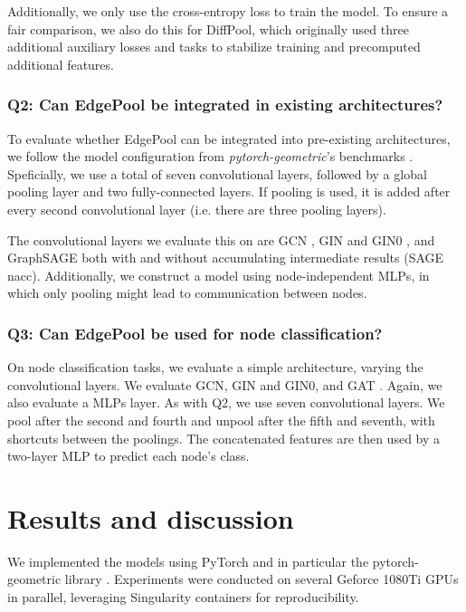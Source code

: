 \documentclass{article}
\newcommand{\edgepool}{EdgePool}
\begin{document}
Additionally, we only use the cross-entropy loss to train the model. To ensure a fair comparison, we also do this for DiffPool, which originally used three additional auxiliary losses and tasks to stabilize training and precomputed additional features.


\subsubsection{Q2: Can \edgepool{} be integrated in existing architectures?}
To evaluate whether \edgepool{} can be integrated into pre-existing architectures, we follow the model configuration from \textit{pytorch-geometric}'s benchmarks \citep{feyFastGraphRepresentation2019}. Speficially, we use a total of seven convolutional layers, followed by a global pooling layer and two fully-connected layers. If pooling is used, it is added after every second convolutional layer (i.e. there are three pooling layers).

The convolutional layers we evaluate this on are GCN \citep{kipf_semi-supervised_2016}, GIN and GIN0 \citep{xu2018how}, and GraphSAGE \citep{hamiltonInductiveRepresentationLearning2017} both with and without accumulating intermediate results (SAGE nacc). Additionally, we construct a model using node-independent \glspl{MLP}, in which only pooling might lead to communication between nodes.


\subsubsection{Q3: Can \edgepool{} be used for node classification?}
On node classification tasks, we evaluate a simple architecture, varying the convolutional layers. We evaluate GCN, GIN and GIN0, and GAT \citep{velickovicGraphAttentionNetworks2017}. Again, we also evaluate a \glspl{MLP} layer. As with Q2, we use seven convolutional layers. We pool after the second and fourth and unpool after the fifth and seventh, with shortcuts between the poolings. The concatenated features are then used by a two-layer MLP to predict each node's class.

 
\section{Results and discussion}

We implemented the models using PyTorch \citep{paszke2017automatic} and in particular the pytorch-geometric library \citep{feyFastGraphRepresentation2019}. Experiments were conducted on several Geforce 1080Ti GPUs in parallel, leveraging Singularity containers \citep{Kurtzer2017} for reproducibility.
\end{document}
